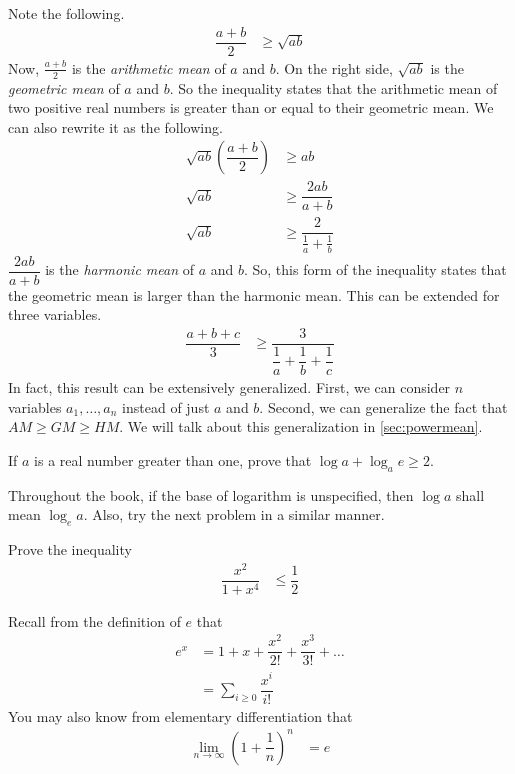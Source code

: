 \documentclass{subfile}
\begin{document}
	Note the following.
		\begin{align*}
			\dfrac{a+b}{2}
				& \geq\sqrt{ab}
		\end{align*}
	Now, $\frac{a+b}{2}$ is the \textit{arithmetic mean} of $a$ and $b$. On the right side, $\sqrt{ab}$ is the \textit{geometric mean} of $a$ and $b$. So the inequality states that the arithmetic mean of two positive real numbers is greater than or equal to their geometric mean. We can also rewrite it as the following.
		\begin{align*}
			\sqrt{ab}\left(\dfrac{a+b}{2}\right)
				& \geq ab\\
			\sqrt{ab}
				& \geq\dfrac{2ab}{a+b}\\
			\sqrt{ab}
				& \geq\dfrac{2}{\frac{1}{a}+\frac{1}{b}}
		\end{align*}
	$\dfrac{2ab}{a+b}$ is the \textit{harmonic mean} of $a$ and $b$. So, this form of the inequality states that the geometric mean is larger than the harmonic mean. This can be extended for three variables.
		\begin{align*}
			\dfrac{a+b+c}{3}
				& \geq\dfrac{3}{\dfrac{1}{a}+\dfrac{1}{b}+\dfrac{1}{c}}
		\end{align*}
	In fact, this result can be extensively generalized. First, we can consider $n$ variables $a_1,\ldots,a_n$ instead of just $a$ and $b$. Second, we can generalize the fact that $AM\geq GM\geq HM$. We will talk about this generalization in \autoref{sec:powermean}.
		\begin{problem}
			If $a$ is a real number greater than one, prove that $\log{a}+\log_{a}{e}\geq2$.
		\end{problem}
	Throughout the book, if the base of logarithm is unspecified, then $\log{a}$ shall mean $\log_{e}{a}$. Also, try the next problem in a similar manner.
		\begin{problem}
			Prove the inequality
				\begin{align*}
					\dfrac{x^2}{1+x^4}
						& \leq\dfrac{1}{2}
				\end{align*}
		\end{problem}
	Recall from the definition of $e$ that
		\begin{align*}
			e^x
				& = 1+x+\dfrac{x^2}{2!}+\dfrac{x^3}{3!}+\ldots\\
				& = \sum_{i\geq0}\dfrac{x^i}{i!}
		\end{align*}
	You may also know from elementary differentiation that
		\begin{align*}
			\lim\limits_{n\to\infty}\left(1+\dfrac{1}{n}\right)^n
				& = e
		\end{align*}
\end{document}
